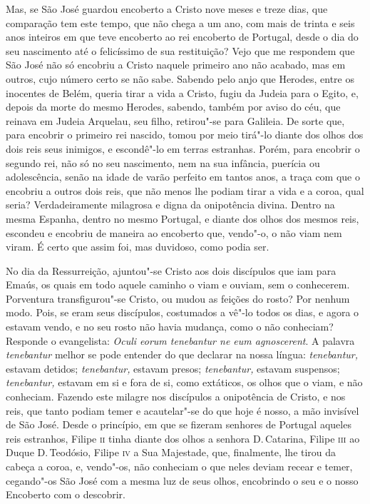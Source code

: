 Mas, se São José guardou encoberto a Cristo nove meses e treze dias, que
comparação tem este tempo, que não chega a um ano, com mais de trinta e
seis anos inteiros em que teve encoberto ao rei encoberto de Portugal,
desde o dia do seu nascimento até o felicíssimo de sua restituição? Vejo
que me respondem que São José não só encobriu a Cristo naquele primeiro
ano não acabado, mas em outros, cujo número certo se não sabe. Sabendo
pelo anjo que Herodes, entre os inocentes de Belém, queria tirar a vida
a Cristo, fugiu da Judeia para o Egito, e, depois da morte do mesmo
Herodes, sabendo, também por aviso do céu, que reinava em Judeia
Arquelau, seu filho, retirou"-se para Galileia. De sorte que, para
encobrir o primeiro rei nascido, tomou por meio tirá"-lo diante dos olhos
dos dois reis seus inimigos, e escondê"-lo em terras estranhas.
Porém, para encobrir o segundo rei, não só no seu nascimento, nem na sua
infância, puerícia ou adolescência, senão na idade de varão perfeito em
tantos anos, a traça com que o encobriu a outros dois reis, que não
menos lhe podiam tirar a vida e a coroa, qual seria? Verdadeiramente
milagrosa e digna da onipotência divina. Dentro na mesma Espanha, dentro
no mesmo Portugal, e diante dos olhos dos mesmos reis, escondeu e
encobriu de maneira ao encoberto que, vendo"-o, o não viam nem viram. É
certo que assim foi, mas duvidoso, como podia ser.

No dia da Ressurreição, ajuntou"-se Cristo aos dois discípulos que iam
para Emaús, os quais em todo aquele caminho o viam e ouviam, sem o
conhecerem. Porventura transfigurou"-se Cristo, ou mudou as feições do
rosto? Por nenhum modo. Pois, se eram seus discípulos, costumados a
vê"-lo todos os dias, e agora o estavam vendo, e no seu rosto não havia
mudança, como o não conheciam? Responde o evangelista: \emph{Oculi eorum
tenebantur ne eum agnoscerent}. A palavra \emph{tenebantur}
melhor se pode entender do que declarar na nossa língua:
\emph{tenebantur,} estavam detidos; \emph{tenebantur,} estavam presos;
\emph{tenebantur,} estavam suspensos; \emph{tenebantur,} estavam em si e
fora de si, como extáticos, os olhos que o viam, e não conheciam.
Fazendo este milagre nos discípulos a onipotência de Cristo, e nos reis,
que tanto podiam temer e acautelar"-se do que hoje é nosso, a mão
invisível de São José.
Desde o princípio, em que se fizeram senhores de Portugal aqueles reis
estranhos, Filipe \textsc{ii} tinha diante dos olhos a senhora D.\,Catarina,
Filipe \textsc{iii} ao Duque D.\,Teodósio, Filipe \textsc{iv} a Sua Majestade, que,
finalmente, lhe tirou da cabeça a coroa, e, vendo"-os, não conheciam o
que neles deviam recear e temer, cegando"-os São José com a mesma luz de
seus olhos, encobrindo o seu e o nosso Encoberto com o descobrir.

